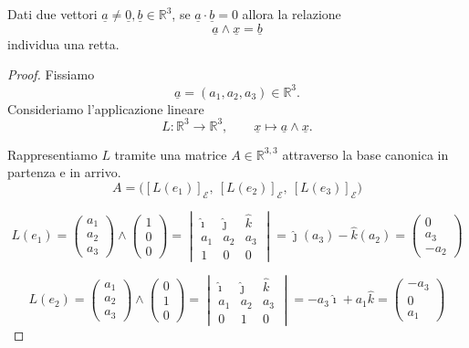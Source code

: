 \begin{lemma}{}
Dati due vettori $\underline{a} \ne \underline{0},\underline{b} \in \mathbb{R}^3$, se $\underline{a}\cdot \underline{b} = 0$ allora la relazione
\[
\underline{a}\wedge \underline{x}=\underline{b}
\]
individua una retta.
\end{lemma}
\inizioapprof
\begin{proof}
Fissiamo
\[
\underline{a}=(a_1,a_2,a_3)\in\mathbb{R}^3.
\]
Consideriamo l'applicazione lineare
\[
L:\mathbb{R}^3\to\mathbb{R}^3,
\qquad
\underline{x}\longmapsto \underline{a}\wedge \underline{x}.
\]

Rappresentiamo $L$ tramite una matrice $A\in\mathbb{R}^{3,3}$ attraverso la base canonica in partenza e in arrivo.
\[
A=\bigl([L(e_1)]_{\mathcal E},\ [L(e_2)]_{\mathcal E},\ [L(e_3)]_{\mathcal E}\bigr)
\]

\[
L(e_1)=
\begin{pmatrix}
a_1\\
a_2\\
a_3
\end{pmatrix}
\wedge
\begin{pmatrix}
1\\
0\\
0
\end{pmatrix}
=
\begin{vmatrix}
\hat{\imath} & \hat{\jmath} & \hat{k}\\
a_1 & a_2 & a_3\\
1 & 0 & 0
\end{vmatrix}
=
\hat{\jmath}(a_3)-\hat{k}(a_2)
=
\begin{pmatrix}
0\\
a_3\\
-a_2
\end{pmatrix}
\]

\[
L(e_2)=
\begin{pmatrix}
a_1\\
a_2\\
a_3
\end{pmatrix}
\wedge
\begin{pmatrix}
0\\
1\\
0
\end{pmatrix}
=
\begin{vmatrix}
\hat{\imath} & \hat{\jmath} & \hat{k}\\
a_1 & a_2 & a_3\\
0 & 1 & 0
\end{vmatrix}
=
-a_3\hat{\imath}+a_1\hat{k}
=
\begin{pmatrix}
-a_3\\
0\\
a_1
\end{pmatrix}
\]


\end{proof}
